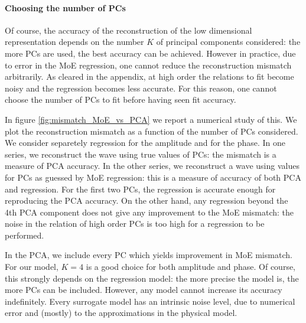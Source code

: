 \paragraph{Choosing the number of PCs}
Of course, the accuracy of the reconstruction of the low dimensional representation depends on the number $K$ of principal components considered: the more PCs are used, the best accuracy can be achieved.
However in practice, due to error in the MoE regression, one cannot reduce the reconstruction mismatch arbitrarily. As cleared in the appendix, at high order the relations to fit become noisy and the regression becomes less accurate.
For this reason, one cannot choose the number of PCs to fit before having seen fit accuracy.
\par
In figure \ref{fig:mismatch_MoE_vs_PCA} we report a numerical study of this. We plot the reconstruction mismatch as a function of the number of PCs considered. We consider separetely regression for the amplitude and for the phase. In one series, we reconstruct the wave using true values of PCs: the mismatch is a measure of PCA accuracy. In the other series, we reconstruct a wave using values for PCs as guessed by MoE regression: this is a measure of accuracy of both PCA and regression.
For the first two PCs, the regression is accurate enough for reproducing the PCA accuracy.
On the other hand, any regression beyond the 4th PCA component does not give any improvement to the MoE mismatch: the noise in the relation of high order PCs is too high for a regression to be performed.
\par
In the PCA, we include every PC which yields improvement in MoE mismatch. For our model, $K = 4$ is a good choice for both amplitude and phase.
Of course, this strongly depends on the regression model: the more precise the model is, the more PCs can be included.
However, any model cannot increase its accuracy indefinitely. Every surrogate model has an intrinsic noise level, due to numerical error and (mostly) to the approximations in the physical model.
